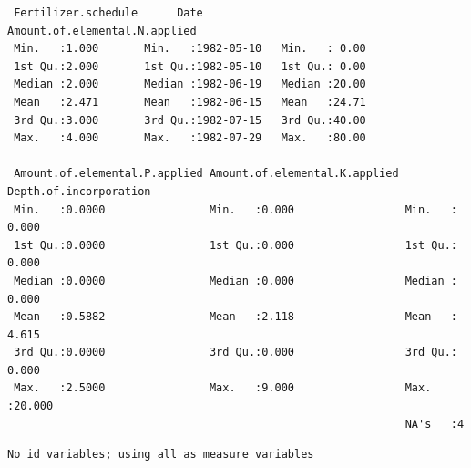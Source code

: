 \documentclass[
]{article}
\begin{document}
\begin{verbatim}
 Fertilizer.schedule      Date            Amount.of.elemental.N.applied
 Min.   :1.000       Min.   :1982-05-10   Min.   : 0.00                
 1st Qu.:2.000       1st Qu.:1982-05-10   1st Qu.: 0.00                
 Median :2.000       Median :1982-06-19   Median :20.00                
 Mean   :2.471       Mean   :1982-06-15   Mean   :24.71                
 3rd Qu.:3.000       3rd Qu.:1982-07-15   3rd Qu.:40.00                
 Max.   :4.000       Max.   :1982-07-29   Max.   :80.00                
                                                                       
 Amount.of.elemental.P.applied Amount.of.elemental.K.applied Depth.of.incorporation
 Min.   :0.0000                Min.   :0.000                 Min.   : 0.000        
 1st Qu.:0.0000                1st Qu.:0.000                 1st Qu.: 0.000        
 Median :0.0000                Median :0.000                 Median : 0.000        
 Mean   :0.5882                Mean   :2.118                 Mean   : 4.615        
 3rd Qu.:0.0000                3rd Qu.:0.000                 3rd Qu.: 0.000        
 Max.   :2.5000                Max.   :9.000                 Max.   :20.000        
                                                             NA's   :4             
\end{verbatim}

\begin{verbatim}
No id variables; using all as measure variables
\end{verbatim}
\end{document}
